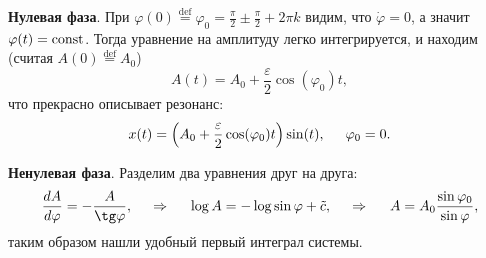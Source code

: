 \textbf{Нулевая фаза}. При $\varphi(0) \overset{\mathrm{def}}{=} \varphi_0 = \tfrac{\pi}{2} \pm \tfrac{\pi}{2} + 2 \pi k$ видим, что $\dot{\varphi} = 0$, а значит $\varphi(t) = \textnormal{const}$. Тогда уравнение на амплитуду легко интегрируется, и находим (считая $A(0) \overset{\mathrm{def}}{=} A_0$)
\begin{equation*}
    A(t) = A_0 + \frac{\varepsilon}{2} \cos(\varphi_0) t,
\end{equation*}
что прекрасно описывает резонанс:
\begin{equation*}
    x(t) = \left(A_0 + \frac{\varepsilon}{2} \cos(\varphi_0)t\right) \sin(t),
    \hspace{5 mm} 
    \varphi_0 = 0.
\end{equation*}



\textbf{Ненулевая фаза}. Разделим два уравнения друг на друга:
\begin{equation*}
    \frac{d A}{d \varphi} = -\frac{A}{\tg \varphi},
    \hspace{0.5cm} \Rightarrow \hspace{0.5cm}
    \log A = - \log \sin \varphi + \tilde{c},
    \hspace{0.5cm} \Rightarrow \hspace{0.5cm}
    A = A_0 \frac{\sin \varphi_0}{\sin \varphi},
\end{equation*}
таким образом нашли удобный первый интеграл системы.

